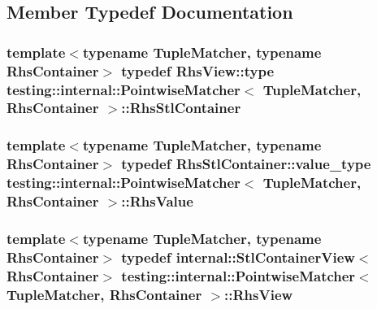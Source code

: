 \subsection{Member Typedef Documentation}
\subsubsection[{\texorpdfstring{Rhs\+Stl\+Container}{RhsStlContainer}}]{\setlength{\rightskip}{0pt plus 5cm}template$<$typename Tuple\+Matcher, typename Rhs\+Container$>$ typedef {\bf Rhs\+View\+::type} {\bf testing\+::internal\+::\+Pointwise\+Matcher}$<$ Tuple\+Matcher, Rhs\+Container $>$\+::{\bf Rhs\+Stl\+Container}}\hypertarget{classtesting_1_1internal_1_1_pointwise_matcher_aadbaec8c93351f29b103816c2e397edd}{}\label{classtesting_1_1internal_1_1_pointwise_matcher_aadbaec8c93351f29b103816c2e397edd}
\subsubsection[{\texorpdfstring{Rhs\+Value}{RhsValue}}]{\setlength{\rightskip}{0pt plus 5cm}template$<$typename Tuple\+Matcher, typename Rhs\+Container$>$ typedef Rhs\+Stl\+Container\+::value\+\_\+type {\bf testing\+::internal\+::\+Pointwise\+Matcher}$<$ Tuple\+Matcher, Rhs\+Container $>$\+::{\bf Rhs\+Value}}\hypertarget{classtesting_1_1internal_1_1_pointwise_matcher_a9f7f1abbfa795033e1e1c1df385b4617}{}\label{classtesting_1_1internal_1_1_pointwise_matcher_a9f7f1abbfa795033e1e1c1df385b4617}
\subsubsection[{\texorpdfstring{Rhs\+View}{RhsView}}]{\setlength{\rightskip}{0pt plus 5cm}template$<$typename Tuple\+Matcher, typename Rhs\+Container$>$ typedef {\bf internal\+::\+Stl\+Container\+View}$<$Rhs\+Container$>$ {\bf testing\+::internal\+::\+Pointwise\+Matcher}$<$ Tuple\+Matcher, Rhs\+Container $>$\+::{\bf Rhs\+View}}\hypertarget{classtesting_1_1internal_1_1_pointwise_matcher_a215d397bfaf0f8bc948cb7b5ff9100c9}{}\label{classtesting_1_1internal_1_1_pointwise_matcher_a215d397bfaf0f8bc948cb7b5ff9100c9}


